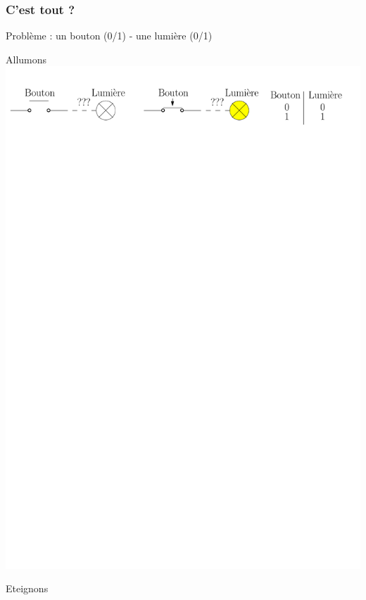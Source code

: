 \documentclass{beamer}
\begin{document}
\begin{frame}
\frametitle{C'est tout ?}
Problème : un bouton (0/1) - une lumière (0/1)
\begin{block}{Allumons}
\centering\includegraphics[width=\linewidth]{Figs/bouton_lumiere1.pdf}
\end{block}
\begin{block}{Eteignons}

\end{block}
\end{frame}
\end{document}
